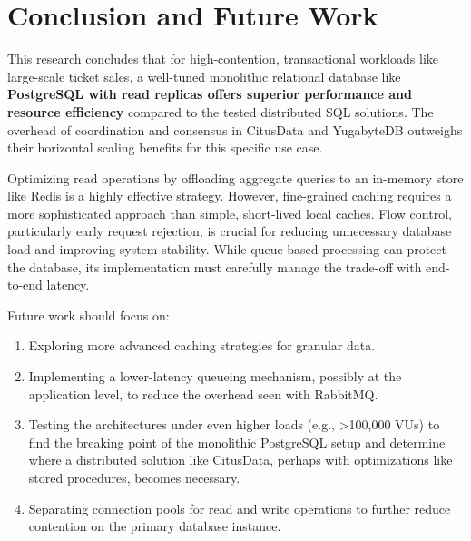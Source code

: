 \section{Conclusion and Future Work}
\label{sec:conclusion}
This research concludes that for high-contention, transactional workloads like large-scale ticket sales, a well-tuned monolithic relational database like \textbf{PostgreSQL with read replicas offers superior performance and resource efficiency} compared to the tested distributed SQL solutions. The overhead of coordination and consensus in CitusData and YugabyteDB outweighs their horizontal scaling benefits for this specific use case.

Optimizing read operations by offloading aggregate queries to an in-memory store like Redis is a highly effective strategy. However, fine-grained caching requires a more sophisticated approach than simple, short-lived local caches. Flow control, particularly early request rejection, is crucial for reducing unnecessary database load and improving system stability. While queue-based processing can protect the database, its implementation must carefully manage the trade-off with end-to-end latency.

Future work should focus on:
\begin{enumerate}
    \item Exploring more advanced caching strategies for granular data.
    \item Implementing a lower-latency queueing mechanism, possibly at the application level, to reduce the overhead seen with RabbitMQ.
    \item Testing the architectures under even higher loads (e.g., >100,000 VUs) to find the breaking point of the monolithic PostgreSQL setup and determine where a distributed solution like CitusData, perhaps with optimizations like stored procedures, becomes necessary.
    \item Separating connection pools for read and write operations to further reduce contention on the primary database instance.
\end{enumerate}
